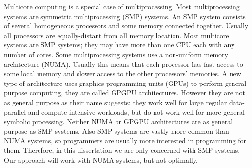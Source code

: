 
Multicore computing is a special case of multiprocessing.
Most multiprocessing systems are symmetric multiprocessing (SMP) systems.
An SMP system consists of several homogeneous processors and some memory
connected together.
Usually all processors are equally-distant from all memory location.
Most multicore systems are SMP systems;
they may have more than one CPU each with any number of cores.
Some multiprocessing systems use a non-uniform memory architecture (NUMA).
Usually this means that each processor has fast access to some local memory
and slower access to the other processors' memories.
A new type of architecture uses graphics programming units (GPUs) to
perform general purpose computing,
they are called GPGPU architectures.
However they are not as general purpose as their name suggests:
they work well for large regular data-parallel and compute-intensive
workloads, but do not work well for more general symbolic processing.
Neither NUMA or GPGPU architectures are as general purpose as SMP systems.
Also SMP systems are vastly more common than NUMA systems,
so programmers are usually more interested in programming for them.
Therefore, in this dissertation we are only concerned with SMP systems.
Our approach will work with NUMA systems, but not optimally.


